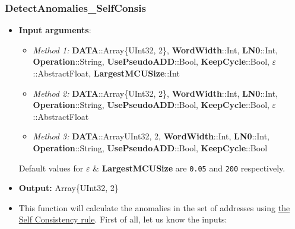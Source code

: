 \subsubsection*{DetectAnomalies\_SelfConsis}\label{Fun:DetectAnomaliesSelfConsis}
\begin{itemize}
	\item \textbf{Input arguments}:
	\begin{itemize}
		\item  \textit{Method 1: }\textbf{DATA}::Array\{UInt32, 2\}, 
		\textbf{WordWidth}::Int,
		\textbf{LN0}::Int,
		\textbf{Operation}::String,
		\textbf{UsePseudoADD}::Bool,
		\textbf{KeepCycle}::Bool,
		\textbf{\(\varepsilon\)}::AbstractFloat,
		\textbf{LargestMCUSize}::Int
		\item  \textit{Method 2: }\textbf{DATA}::Array\{UInt32, 2\}, 
		\textbf{WordWidth}::Int,
		\textbf{LN0}::Int,
		\textbf{Operation}::String,
		\textbf{UsePseudoADD}::Bool,
		\textbf{KeepCycle}::Bool,
		\textbf{\(\varepsilon\)}::AbstractFloat
		\item  \textit{Method 3: }\textbf{DATA}::Array{UInt32, 2}, 
		\textbf{WordWidth}::Int,
		\textbf{LN0}::Int,
		\textbf{Operation}::String,
		\textbf{UsePseudoADD}::Bool,
		\textbf{KeepCycle}::Bool
	\end{itemize}

	Default values for \textbf{\(\varepsilon\)} \& 	\textbf{LargestMCUSize} are \texttt{0.05} and \texttt{200} respectively.
	\item \textbf{Output: } Array\{UInt32, 2\}	
	\item This function will calculate the anomalies in the set of addresses using \hyperref[Subsec:SelfConsistencyRule]{the Self Consistency rule}. 
	 First of all, let us know the inputs:
	 \begin{itemize}
	

\end{itemize}
\end{itemize}
